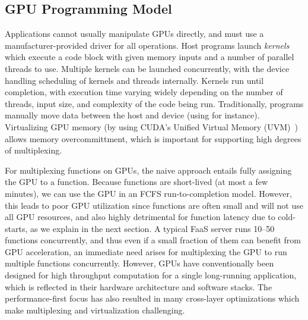 
\subsection{GPU Programming Model}

Applications cannot usually manipulate GPUs directly, and must use a manufacturer-provided driver for all operations.
Host programs launch \emph{kernels} which execute a code block with given memory inputs and a number of parallel threads to use.
Multiple kernels can be launched concurrently, with the device handling scheduling of kernels and threads internally.
Kernels run until completion, with execution time varying widely depending on the number of threads, input size, and complexity of the code being run. 
Traditionally, programs manually move data between the host and device (using  for instance).
Virtualizing GPU memory (by using CUDA's Unified Virtual Memory (UVM)~\cite{nvidia-uvm}) allows memory overcommittment, which is important for supporting high degrees of multiplexing.

For multiplexing functions on GPUs, the naive approach entails fully assigning the GPU to a function. 
Because functions are short-lived (at most a few minutes), we can use the GPU in an FCFS run-to-completion model. 
However, this leads to poor GPU utilization since functions are often small and will not use all GPU resources, and also highly detrimental for function latency due to cold-starts, as we explain in the next section. 
A typical FaaS server runs 10--50 functions concurrently, and thus even if a small fraction of them can benefit from GPU acceleration, an immediate need arises for multiplexing the GPU to run multiple functions concurrently. 
However, GPUs have conventionally been designed for high throughput computation for a single long-running application, which is reflected in their hardware architecture and software stacks.
The performance-first focus has also resulted in many cross-layer optimizations which make multiplexing and virtualization challenging. 


